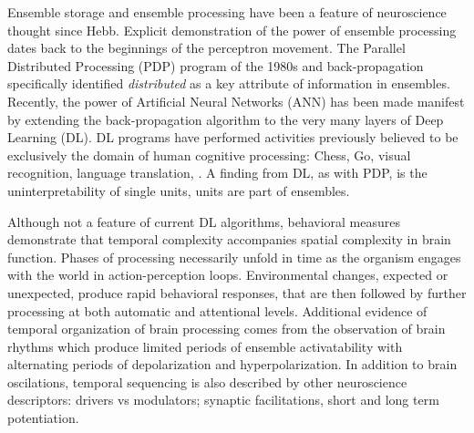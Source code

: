 \documentclass[12pt]{article}
\begin{document}
Ensemble storage and ensemble processing have been a feature of neuroscience thought since Hebb.\cite{Hebb1949-qt}
Explicit demonstration of the power of ensemble processing dates back to the beginnings of the perceptron movement.\cite{Rosenblatt1958-ff}
The Parallel Distributed Processing (PDP) program of the 1980s and back-propagation specifically identified {\em distributed} as a key attribute of information in
ensembles.\cite{Hinton1986-vi,Rumelhart1986-ko} Recently, the power of Artificial Neural Networks (ANN)
has been made manifest by extending the back-propagation algorithm to the very many layers of Deep Learning (DL). DL programs have performed activities previously believed to be
exclusively the domain of human cognitive processing: Chess, Go, visual recognition, language translation, \etc.
A finding from DL, as with PDP, is the uninterpretability of single units, units are part of ensembles.


Although not a feature of current DL algorithms, behavioral measures demonstrate that temporal complexity accompanies spatial complexity in brain function.
Phases of processing necessarily unfold in time as the organism engages with the world in action-perception loops.\cite{Little2013-wn}
Environmental changes, expected or unexpected, produce rapid behavioral responses, that are then followed by further processing at both automatic and attentional levels.
Additional evidence of temporal organization of brain processing comes from the observation of brain
rhythms which produce limited periods of ensemble activatability with alternating periods of depolarization and hyperpolarization.
In addition to brain oscilations, temporal sequencing is also described by other neuroscience descriptors:
drivers vs modulators; synaptic facilitations, short and long term potentiation.

\end{document}
